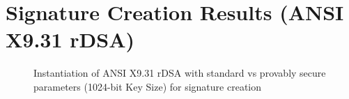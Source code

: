 \documentclass[]{final_report}
\theoremstyle{definition}
\begin{document}
\section{Signature Creation Results (ANSI X9.31 rDSA)}

\begin{figure}[H]
    \centering %
     \caption{Instantiation of ANSI X9.31 rDSA with standard vs provably secure parameters (1024-bit Key Size) for signature creation}
    \begin{minipage}{\textwidth}
        \centering
    \end{minipage}
            \label{ansi_sign_1024bit_table}
  \end{figure}
  
\end{document}

